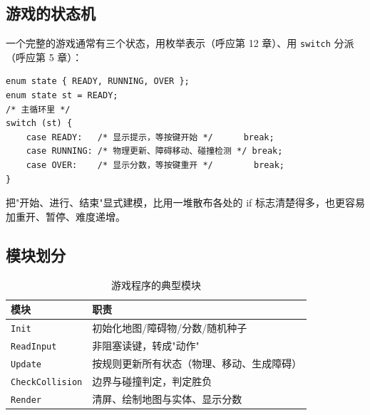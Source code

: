 \subsection{游戏的状态机}
一个完整的游戏通常有三个状态，用枚举表示（呼应第 12 章）、用 \texttt{switch} 分派（呼应第 5 章）：
\begin{lstlisting}
enum state { READY, RUNNING, OVER };
enum state st = READY;
/* 主循环里 */
switch (st) {
    case READY:   /* 显示提示，等按键开始 */      break;
    case RUNNING: /* 物理更新、障碍移动、碰撞检测 */ break;
    case OVER:    /* 显示分数，等按键重开 */        break;
}
\end{lstlisting}
把"开始、进行、结束"显式建模，比用一堆散布各处的 if 标志清楚得多，也更容易加重开、暂停、难度递增。

\subsection{模块划分}
\begin{table}[htbp]
\centering
\caption{游戏程序的典型模块}
\footnotesize
\begin{tabularx}{\textwidth}{@{}p{2.6cm}X@{}}
\toprule
模块 & 职责 \\
\midrule
\texttt{Init} & 初始化地图/障碍物/分数/随机种子 \\
\texttt{ReadInput} & 非阻塞读键，转成"动作" \\
\texttt{Update} & 按规则更新所有状态（物理、移动、生成障碍） \\
\texttt{CheckCollision} & 边界与碰撞判定，判定胜负 \\
\texttt{Render} & 清屏、绘制地图与实体、显示分数 \\
\bottomrule
\end{tabularx}
\end{table}


